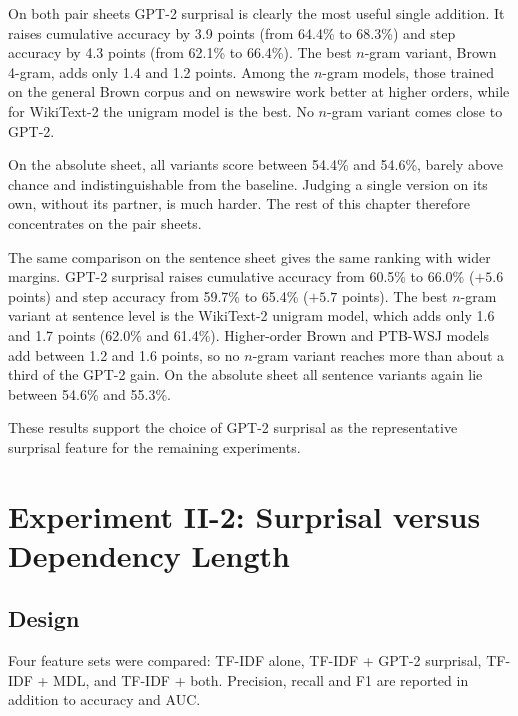 \documentclass[12pt,a4paper,oneside]{report}
\begin{document}
On both pair sheets GPT-2 surprisal is clearly the most useful single addition. It raises cumulative accuracy by 3.9 points (from 64.4\% to 68.3\%) and step accuracy by 4.3 points (from 62.1\% to 66.4\%). The best $n$-gram variant, Brown 4-gram, adds only 1.4 and 1.2 points. Among the $n$-gram models, those trained on the general Brown corpus and on newswire work better at higher orders, while for WikiText-2 the unigram model is the best. No $n$-gram variant comes close to GPT-2.

On the absolute sheet, all variants score between 54.4\% and 54.6\%, barely above chance and indistinguishable from the baseline. Judging a single version on its own, without its partner, is much harder. The rest of this chapter therefore concentrates on the pair sheets.

The same comparison on the sentence sheet gives the same ranking with wider margins. GPT-2 surprisal raises cumulative accuracy from 60.5\% to 66.0\% ($+5.6$ points) and step accuracy from 59.7\% to 65.4\% ($+5.7$ points). The best $n$-gram variant at sentence level is the WikiText-2 unigram model, which adds only 1.6 and 1.7 points (62.0\% and 61.4\%). Higher-order Brown and PTB-WSJ models add between 1.2 and 1.6 points, so no $n$-gram variant reaches more than about a third of the GPT-2 gain. On the absolute sheet all sentence variants again lie between 54.6\% and 55.3\%.

These results support the choice of GPT-2 surprisal as the representative surprisal feature for the remaining experiments.

\section{Experiment II-2: Surprisal versus Dependency Length}
\subsection{Design}
Four feature sets were compared: TF-IDF alone, TF-IDF + GPT-2 surprisal, TF-IDF + MDL, and TF-IDF + both. Precision, recall and F1 are reported in addition to accuracy and AUC.
\end{document}
